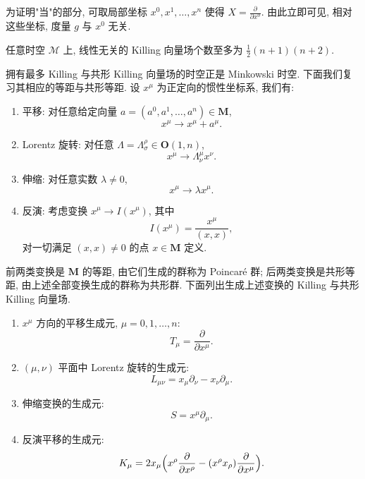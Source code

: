 为证明"当"的部分, 可取局部坐标 $x^0,x^1,\ldots,x^n$ 使得 $X=\frac{\partial}{\partial x^0}$. 由此立即可见, 相对这些坐标, 度量 $g$ 与 $x^0$ 无关.
\begin{proposition}\label{prop:4.6}
任意时空 $\mathcal{M}$ 上, 线性无关的 Killing 向量场个数至多为 $\frac12(n+1)(n+2)$.\end{proposition}

拥有最多 Killing 与共形 Killing 向量场的时空正是 Minkowski 时空. 下面我们复习其相应的等距与共形等距.
设 $x^\mu$ 为正定向的惯性坐标系, 我们有:
\begin{enumerate}
\item 平移: 对任意给定向量 $a=(a^0,a^1,\ldots,a^n)\in\mathbf{M}$,
\begin{equation}
x^\mu\to x^\mu+a^\mu.\end{equation}
\item Lorentz 旋转: 对任意 $\Lambda=\Lambda^\rho_\sigma\in\mathbf{O}(1,n)$,
\begin{equation}
x^\mu\to \Lambda^\mu_\nu x^\nu.\end{equation}
\item 伸缩: 对任意实数 $\lambda\neq 0$,
\begin{equation}
x^\mu\to \lambda x^\mu.\end{equation}
\item 反演: 考虑变换 $x^\mu\to I(x^\mu)$, 其中
\begin{equation}
I(x^\mu)=\frac{x^\mu}{(x,x)},\end{equation}
对一切满足 $(x,x)\neq 0$ 的点 $x\in\mathbf{M}$ 定义.\end{enumerate}

前两类变换是 $\mathbf{M}$ 的等距, 由它们生成的群称为 Poincar\'e 群; 后两类变换是共形等距, 由上述全部变换生成的群称为共形群. 下面列出生成上述变换的 Killing 与共形 Killing 向量场.
\begin{enumerate}[label=\roman*.]
\item $x^\mu$ 方向的平移生成元, $\mu=0,1,\ldots,n$:
\begin{equation}
T_\mu=\frac{\partial}{\partial x^\mu}.\end{equation}
\item $(\mu,\nu)$ 平面中 Lorentz 旋转的生成元:
\begin{equation}
L_{\mu\nu}=x_\mu\partial_\nu-x_\nu\partial_\mu.\end{equation}
\item 伸缩变换的生成元:
\begin{equation}
S=x^\mu\partial_\mu.\end{equation}
\item 反演平移的生成元:
\begin{equation}
K_\mu=2x_\mu\Bigl(x^\rho\frac{\partial}{\partial x^\rho}-(x^\rho x_\rho)\frac{\partial}{\partial x^\mu}\Bigr).\end{equation}
\end{enumerate}

